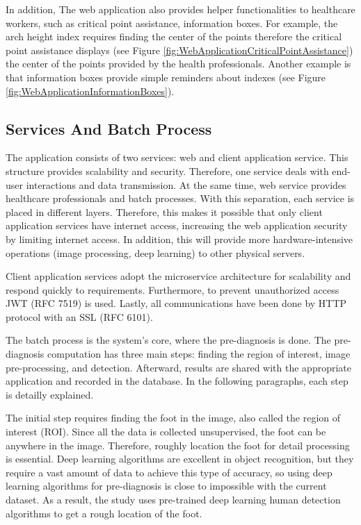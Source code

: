 In addition, The web application also provides helper functionalities to healthcare workers, such as critical point assistance, information boxes. For example, the arch height index requires finding the center of the points therefore the critical point assistance displays (see Figure \ref{fig:WebApplicationCriticalPointAssistance}) the center of the points provided by the health professionals. Another example is that information boxes provide simple reminders about indexes (see Figure \ref{fig:WebApplicationInformationBoxes}).

\subsection{Services And Batch Process} \label{sec:StudyIServicesAndBatchProcess}
The application consists of two services: web and client application service. This structure provides scalability and security. Therefore, one service deals with end-user interactions and data transmission. At the same time, web service provides healthcare professionals and batch processes. With this separation, each service is placed in different layers. Therefore, this makes it possible that only client application services have internet access, increasing the web application security by limiting internet access.  In addition, this will provide more hardware-intensive operations (image processing, deep learning) to other physical servers. 

Client application services adopt the microservice architecture for scalability and respond quickly to requirements. Furthermore, to prevent unauthorized access JWT (RFC 7519) is used. Lastly, all communications have been done by HTTP protocol with an SSL (RFC 6101). 

The batch process is the system's core, where the pre-diagnosis is done. The pre-diagnosis computation has three main steps: finding the region of interest, image pre-processing, and detection. Afterward, results are shared with the appropriate application and recorded in the database. In the following paragraphs, each step is detailly explained.

The initial step requires finding the foot in the image, also called the region of interest (ROI). Since all the data is collected unsupervised, the foot can be anywhere in the image. Therefore, roughly location the foot for detail processing is essential. Deep learning algorithms are excellent in object recognition, but they require a vast amount of data to achieve this type of accuracy, so using deep learning algorithms for pre-diagnosis is close to impossible with the current dataset. As a result, the study uses pre-trained deep learning human detection algorithms to get a rough location of the foot.

